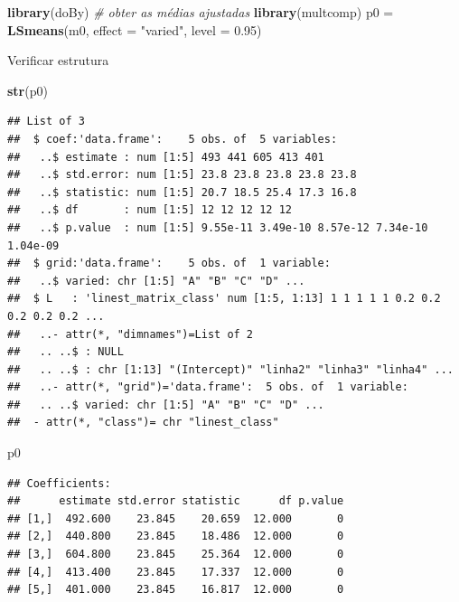 \documentclass[
]{book}
\newenvironment{Shaded}{\begin{snugshade}}{\end{snugshade}}
\newcommand{\CommentTok}[1]{\textcolor[rgb]{0.56,0.35,0.01}{\textit{#1}}}
\newcommand{\DataTypeTok}[1]{\textcolor[rgb]{0.13,0.29,0.53}{#1}}
\newcommand{\FloatTok}[1]{\textcolor[rgb]{0.00,0.00,0.81}{#1}}
\newcommand{\KeywordTok}[1]{\textcolor[rgb]{0.13,0.29,0.53}{\textbf{#1}}}
\newcommand{\NormalTok}[1]{#1}
\newcommand{\StringTok}[1]{\textcolor[rgb]{0.31,0.60,0.02}{#1}}
\begin{document}
\begin{Shaded}
\begin{Highlighting}[]
\KeywordTok{library}\NormalTok{(doBy) }\CommentTok{# obter as médias ajustadas }
\KeywordTok{library}\NormalTok{(multcomp)}
\NormalTok{p0 =}\StringTok{ }\KeywordTok{LSmeans}\NormalTok{(m0, }\DataTypeTok{effect =} \StringTok{"varied"}\NormalTok{, }\DataTypeTok{level =} \FloatTok{0.95}\NormalTok{)}
\end{Highlighting}
\end{Shaded}

Verificar estrutura

\begin{Shaded}
\begin{Highlighting}[]
\KeywordTok{str}\NormalTok{(p0)}
\end{Highlighting}
\end{Shaded}

\begin{verbatim}
## List of 3
##  $ coef:'data.frame':    5 obs. of  5 variables:
##   ..$ estimate : num [1:5] 493 441 605 413 401
##   ..$ std.error: num [1:5] 23.8 23.8 23.8 23.8 23.8
##   ..$ statistic: num [1:5] 20.7 18.5 25.4 17.3 16.8
##   ..$ df       : num [1:5] 12 12 12 12 12
##   ..$ p.value  : num [1:5] 9.55e-11 3.49e-10 8.57e-12 7.34e-10 1.04e-09
##  $ grid:'data.frame':    5 obs. of  1 variable:
##   ..$ varied: chr [1:5] "A" "B" "C" "D" ...
##  $ L   : 'linest_matrix_class' num [1:5, 1:13] 1 1 1 1 1 0.2 0.2 0.2 0.2 0.2 ...
##   ..- attr(*, "dimnames")=List of 2
##   .. ..$ : NULL
##   .. ..$ : chr [1:13] "(Intercept)" "linha2" "linha3" "linha4" ...
##   ..- attr(*, "grid")='data.frame':  5 obs. of  1 variable:
##   .. ..$ varied: chr [1:5] "A" "B" "C" "D" ...
##  - attr(*, "class")= chr "linest_class"
\end{verbatim}

\begin{Shaded}
\begin{Highlighting}[]
\NormalTok{p0}
\end{Highlighting}
\end{Shaded}

\begin{verbatim}
## Coefficients:
##      estimate std.error statistic      df p.value
## [1,]  492.600    23.845    20.659  12.000       0
## [2,]  440.800    23.845    18.486  12.000       0
## [3,]  604.800    23.845    25.364  12.000       0
## [4,]  413.400    23.845    17.337  12.000       0
## [5,]  401.000    23.845    16.817  12.000       0
\end{verbatim}
\end{document}
